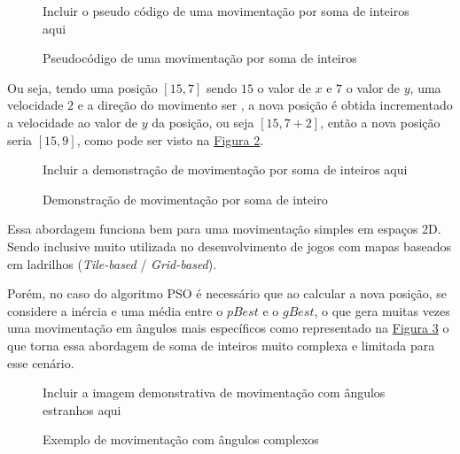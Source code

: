             \begin{figure}[h]
                \centering
                \small{Incluir o pseudo código de uma movimentação por soma de inteiros aqui}
                \caption{Pseudocódigo de uma movimentação por soma de inteiros}
                \label{alg:mov-int-sum}
            \end{figure}
            
            Ou seja, tendo uma posição $[15, 7]$ sendo $15$ o valor de $x$ e $7$ o valor de $y$,
            uma velocidade $2$ e a direção do movimento ser , a nova posição é obtida incrementado a velocidade ao valor de $y$ da posição, ou seja $[15, 7+2]$, então a nova posição seria $[15, 9]$, como pode ser visto na 
            \hyperref[fig:movimentacao-int-sum]{Figura \ref{fig:movimentacao-int-sum}}.\newline
            
            \begin{figure}[h]
                \centering
                \small{Incluir a demonstração de movimentação por soma de inteiros aqui}
                \caption{Demonstração de movimentação por soma de inteiro}
                \label{fig:movimentacao-int-sum}
            \end{figure}
            
            Essa abordagem funciona bem para uma movimentação simples em espaços 2D. Sendo inclusive muito utilizada no desenvolvimento de jogos com mapas baseados em ladrilhos (\textit{Tile-based} / \textit{Grid-based}).\newline
            
            Porém, no caso do algoritmo PSO é necessário que ao calcular a nova posição, se considere a inércia e uma média entre o $pBest$ e o $gBest$, o que gera muitas vezes uma movimentação em ângulos mais específicos como representado na 
            \hyperref[fig:angular-moviment-grid-based]{Figura \ref{fig:angular-moviment-grid-based}}
            o que torna essa abordagem de soma de inteiros muito complexa e limitada para esse cenário.\newline
            
            \begin{figure}[h]
                \centering
                \small{Incluir a imagem demonstrativa de movimentação com ângulos estranhos aqui}
                \caption{Exemplo de movimentação com ângulos complexos}
                \label{fig:angular-moviment-grid-based}
            \end{figure}
            
